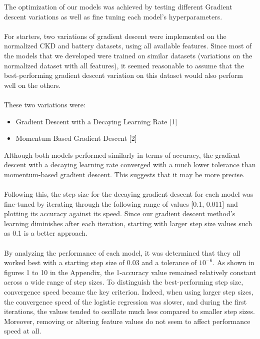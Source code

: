 \documentclass{article}
\begin{document}
The optimization of our models was achieved by testing different Gradient descent variations as well as fine tuning each model’s hyperparameters.  
\\
\\
For starters, two variations of gradient descent were implemented on the normalized CKD and battery datasets, using all available features. Since most of the models that we developed were trained on similar datasets (variations on the normalized dataset with all features), it seemed reasonable to assume that the best-performing gradient descent variation on this dataset would also perform well on the others. 
\\
\\
These two variations were: 
\begin{itemize}
  \item Gradient Descent with a Decaying Learning Rate [1]
  \item Momentum Based Gradient Descent [2]  
\end{itemize}
Although both models performed similarly in terms of accuracy, the gradient descent with a decaying learning rate converged with a much lower tolerance than momentum-based gradient descent. This suggests that it may be more precise. 
\\
\\
Following this, the step size for the decaying gradient descent for each model was fine-tuned by iterating through the following range of values [0.1, 0.011] and plotting its accuracy against its speed. Since our gradient descent method’s learning diminishes after each iteration, starting with larger step size values such as 0.1 is a better approach.  
\\
\\
By analyzing the performance of each model, it was determined that they all worked best with a starting step size of 0.03 and a tolerance of $10^{-6}$. As shown in figures 1 to 10 in the Appendix, the 1-accuracy value remained relatively constant across a wide range of step sizes. To distinguish the best-performing step size, convergence speed became the key criterion.  Indeed, when using larger step sizes, the convergence speed of the logistic regression was slower, and during the first iterations, the values tended to oscillate much less compared to smaller step sizes. Moreover, removing or altering feature values do not seem to affect performance speed at all. 
\end{document}
